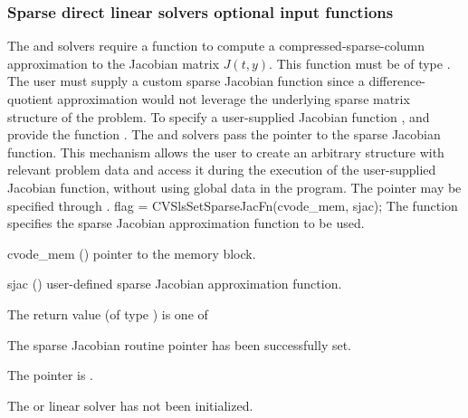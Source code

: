 \subsubsection{Sparse direct linear solvers optional input functions}\label{sss:optin_sls}
The 
{\cvklu} and {\cvsuperlumt} solvers require a function to compute a
compressed-sparse-column approximation to the Jacobian matrix
$J(t,y)$.  This function must be of type .  
The user must supply a custom sparse Jacobian function since a
difference-quotient approximation would not leverage the underlying
sparse matrix structure of the problem.  To specify a user-supplied
Jacobian function , {\cvklu} and {\cvsuperlumt} provide the
function .  The {\cvklu} and {\cvsuperlumt}
solvers pass the pointer  to the sparse Jacobian
function. This mechanism allows the user to create an arbitrary structure with
relevant problem data and access it during the execution of the
user-supplied Jacobian function, without using global data in the program.  
The pointer  may be specified through .
{
  flag = CVSlsSetSparseJacFn(cvode\_mem, sjac);
}
{
  The function  specifies the sparse Jacobian
  approximation function to be used.
}
{
  \begin{args}
  \item[cvode\_mem] ()
    pointer to the {\cvode} memory block.
  \item[sjac] ()
    user-defined sparse Jacobian approximation function.
  \end{args}
}
{
  The return value  (of type ) is one of
  \begin{args}
  \item[\Id{CVSLS\_SUCCESS}] 
    The sparse Jacobian routine pointer has been successfully set.
  \item[\Id{CVSLS\_MEM\_NULL}]
    The  pointer is .
  \item[\Id{CVSLS\_LMEM\_NULL}]
    The {\cvklu} or {\cvsuperlumt} linear solver has not been initialized.
  \end{args}
}
